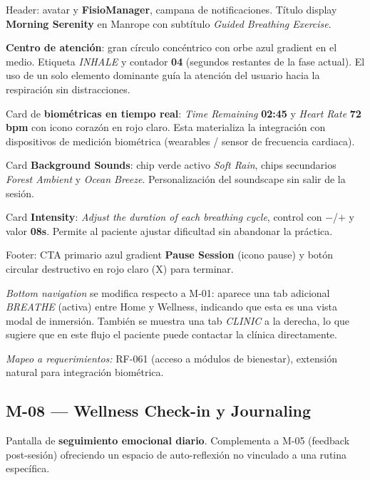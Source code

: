 Header: avatar y \textbf{FisioManager}, campana de notificaciones. Título display \textbf{Morning Serenity} en Manrope con subtítulo \textit{Guided Breathing Exercise}.

\textbf{Centro de atención}: gran círculo concéntrico con orbe azul gradient en el medio. Etiqueta \textit{INHALE} y contador \textbf{04} (segundos restantes de la fase actual). El uso de un solo elemento dominante guía la atención del usuario hacia la respiración sin distracciones.

Card de \textbf{biométricas en tiempo real}: \textit{Time Remaining} \textbf{02:45} y \textit{Heart Rate} \textbf{72 bpm} con icono corazón en rojo claro. Esta materializa la integración con dispositivos de medición biométrica (wearables / sensor de frecuencia cardiaca).

Card \textbf{Background Sounds}: chip verde activo \textit{Soft Rain}, chips secundarios \textit{Forest Ambient} y \textit{Ocean Breeze}. Personalización del soundscape sin salir de la sesión.

Card \textbf{Intensity}: \textit{Adjust the duration of each breathing cycle}, control con $-$/$+$ y valor \textbf{08s}. Permite al paciente ajustar dificultad sin abandonar la práctica.

Footer: CTA primario azul gradient \textbf{Pause Session} (icono pause) y botón circular destructivo en rojo claro (X) para terminar.

\textit{Bottom navigation} se modifica respecto a M-01: aparece una tab adicional \textit{BREATHE} (activa) entre Home y Wellness, indicando que esta es una vista modal de inmersión. También se muestra una tab \textit{CLINIC} a la derecha, lo que sugiere que en este flujo el paciente puede contactar la clínica directamente.

\textit{Mapeo a requerimientos:} RF-061 (acceso a módulos de bienestar), extensión natural para integración biométrica.


\subsection{M-08 --- Wellness Check-in y Journaling}

Pantalla de \textbf{seguimiento emocional diario}. Complementa a M-05 (feedback post-sesión) ofreciendo un espacio de auto-reflexión no vinculado a una rutina específica.

